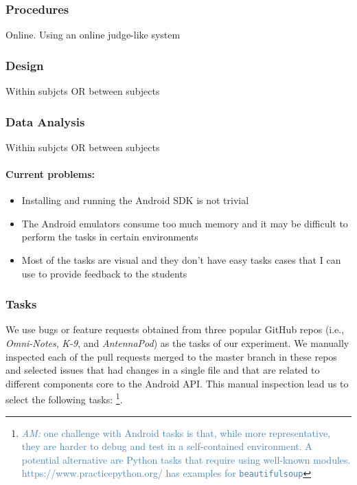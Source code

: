 \subsubsection{Procedures}
\label{cp6:evaluation-procedures}

Online. Using an online judge-like system


\subsubsection{Design}


Within subjcts OR between subjects



\subsubsection{Data Analysis}


Within subjcts OR between subjects



\clearpage



\smallskip
\paragraph{\textbf{Current problems:}}

\begin{itemize}
    \item Installing and running the Android SDK is not trivial
    \item The Android emulators consume too much memory and it may be difficult to perform the tasks in certain environments
    \item Most of the tasks are visual and they don't have easy tasks cases that I can use to provide feedback to the students
\end{itemize}



\subsubsection{Tasks}

We use bugs or feature requests obtained from three popular  GitHub repos (i.e., \textit{Omni-Notes}, \textit{K-9}, and \textit{AntennaPod}) as the tasks of our experiment. 
We manually inspected each of the pull requests merged to the master branch in these repos and selected issues that had changes in a single file and that are related to different components core to the Android API.
This manual inspection lead us to select the following tasks:
\footnote{
\textcolor{steelblue}{{\textit{AM:} one challenge with Android tasks is that, while more representative, they are harder to debug and test in a self-contained environment.
A potential alternative are Python tasks that require using well-known modules. https://www.practicepython.org/ has examples for \texttt{beautifulsoup}}}}.

